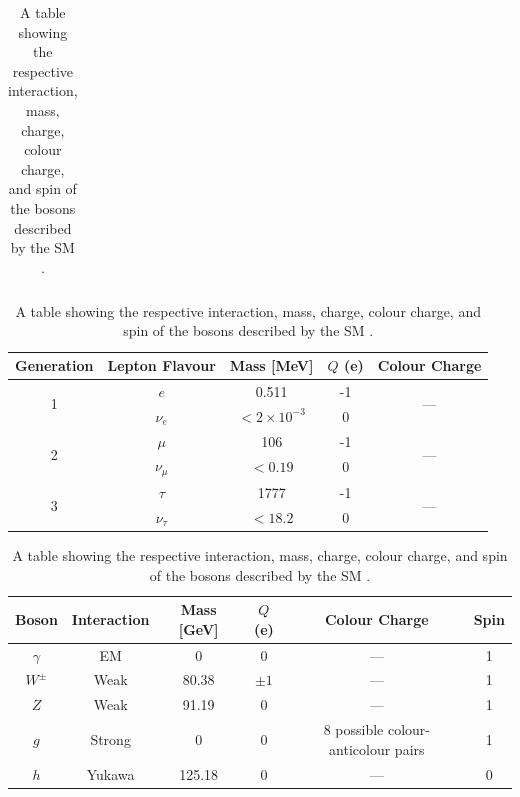 \documentclass[12pt,a4paper,epsf,portrait,times,epsfig]{report}
\begin{document}
\begin{table} [h!]
\begin{center}
\begin{tabular}{ c|c|c|c|c }
			\end{tabular}
			\caption{A table showing the mass, charge, and colour charge of the quark generations described by the SM \cite{Article:PDG}. \mbox{}\\}
			\label{tab:SMQuarks1}
			\begin{tabular}{ c|c|c|c|c }
				\hline \hline
				Generation & Lepton Flavour & Mass [MeV] & $Q$ (e) & Colour Charge \rule{0pt}{2.6ex}\rule[-0.9ex]{0pt}{0pt}\\
				\hline \hline
				\multirow{2}{*}{1} & $e$ & 0.511 & -1 & \multirow{2}{*}{---} \rule{0pt}{2.6ex}\rule[-0.9ex]{0pt}{0pt}\\
				                   & $\nu_{e}$ & $< 2\times10^{-3}$ & 0 & \rule{0pt}{2.6ex}\rule[-0.9ex]{0pt}{0pt}\\
				\hline
				\multirow{2}{*}{2} & $\mu$ & 106 & -1 & \multirow{2}{*}{---} \rule{0pt}{2.6ex}\rule[-0.9ex]{0pt}{0pt}\\
				                   & $\nu_{\mu}$ & $< 0.19$ & 0 & \rule{0pt}{2.6ex}\rule[-0.9ex]{0pt}{0pt}\\
				\hline
				\multirow{2}{*}{3} & $\tau$ & 1777 & -1 & \multirow{2}{*}{---} \rule{0pt}{2.6ex}\rule[-0.9ex]{0pt}{0pt}\\
				                   & $\nu_{\tau}$ & $ < 18.2$ & 0 & \rule{0pt}{2.6ex}\rule[-0.9ex]{0pt}{0pt}\\
				\hline \hline
			\end{tabular}
				\caption{A table showing the mass, charge, and colour charge of the leptons described by the SM \cite{Article:PDG}. \mbox{}\\} 
				\label{tab:SMLeptons1}
			\begin{tabular}{ c|c|c|c|c|c }
					\hline \hline
					Boson & Interaction & Mass [GeV] & $Q$ (e) & Colour Charge & Spin \rule{0pt}{2.6ex}\rule[-0.9ex]{0pt}{0pt}\\
					\hline \hline
					$\gamma$ & EM & 0 & 0 & --- & 1 \rule{0pt}{2.6ex}\rule[-0.9ex]{0pt}{0pt}\\
					\hline
					$W^{\pm}$ & Weak & 80.38 & $\pm 1$ & --- & 1 \rule{0pt}{2.6ex}\rule[-0.9ex]{0pt}{0pt}\\ \hline
					$Z$ & Weak & 91.19 & 0 & --- & 1 \rule{0pt}{2.6ex}\rule[-0.9ex]{0pt}{0pt}\\ \hline
					$g$ & Strong & 0 & 0 & 8 possible colour-anticolour pairs & 1 \rule{0pt}{2.6ex}\rule[-0.9ex]{0pt}{0pt}\\ \hline
					$h$ & Yukawa & 125.18 & 0 & --- & 0 \rule{0pt}{2.6ex}\rule[-0.9ex]{0pt}{0pt}\\ 
					\hline \hline
			\end{tabular}
					\caption{A table showing the respective interaction, mass, charge, colour charge, and spin of the bosons described by the SM \cite{Article:PDG}. \mbox{}\\}
					\label{tab:SMBosons1} 
		\end{center}
	\end{table}
\end{document}
